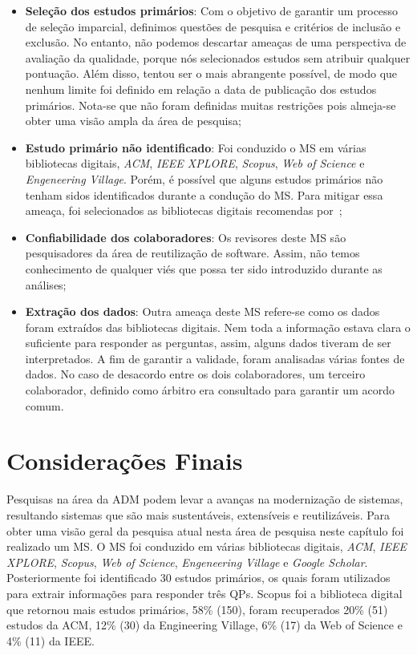 \begin{itemize}
\item \textbf{Seleção dos estudos primários}: Com o objetivo de garantir um processo de seleção imparcial, definimos questões de pesquisa e critérios de inclusão e exclusão.
No entanto, não podemos descartar ameaças de uma perspectiva de avaliação da qualidade, porque nós selecionados estudos sem atribuir qualquer pontuação. Além disso, tentou ser o mais abrangente possível, de modo que nenhum limite foi definido em relação a data de publicação dos estudos primários. Nota-se que não foram definidas muitas restrições pois almeja-se obter uma visão ampla da área de pesquisa;

\item \textbf{Estudo primário não identificado}: Foi conduzido o MS em várias bibliotecas digitais, \textit{ACM}, \textit{IEEE XPLORE}, \textit{Scopus}, \textit{Web of Science} e \textit{Engeneering Village}. Porém, é possível que alguns estudos primários não tenham sidos identificados durante a condução do MS. Para mitigar essa ameaça, foi selecionados as bibliotecas digitais recomendas por~;

\item \textbf{Confiabilidade dos colaboradores}: Os revisores deste MS são pesquisadores da área de reutilização de software. Assim, não temos conhecimento de qualquer viés que possa ter sido introduzido durante as análises;

\item \textbf{Extração dos dados}: Outra ameaça deste MS refere-se como os dados foram extraídos das bibliotecas digitais. Nem toda a informação estava clara o suficiente para responder as perguntas, assim, alguns dados tiveram de ser interpretados.
A fim de garantir a validade, foram analisadas várias fontes de dados. No caso de desacordo entre os dois colaboradores, um terceiro colaborador, definido como árbitro era consultado para garantir um acordo comum.

\end{itemize}


\section{Considerações Finais}\label{sec:considerações_finais_do_mapeamento_sistematico}

Pesquisas na área da ADM podem levar a avanças na modernização de sistemas, resultando sistemas que são mais sustentáveis, extensíveis e reutilizáveis. Para obter uma visão geral da pesquisa atual nesta área de pesquisa neste capítulo foi realizado um MS. O MS foi conduzido em várias bibliotecas digitais, \textit{ACM}, \textit{IEEE XPLORE}, \textit{Scopus}, \textit{Web of Science}, \textit{Engeneering Village} e \textit{Google Scholar}. Posteriormente foi identificado 30 estudos primários, os quais foram utilizados para extrair informações para responder três QPs. Scopus foi a biblioteca digital que retornou mais estudos primários, 58\% (150), foram recuperados 20\% (51) estudos da ACM, 12\% (30) da Engineering Village, 6\% (17) da Web of Science e 4\% (11) da IEEE. 

